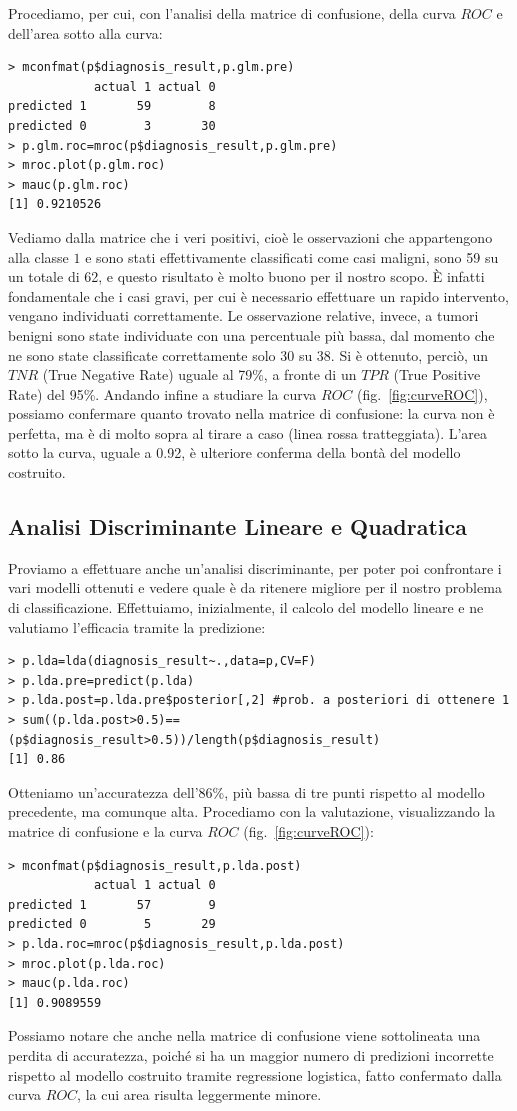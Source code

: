 \documentclass[11pt,a4paper,oneside]{article}
\begin{document}
Procediamo, per cui, con l'analisi della matrice di confusione, della curva $ROC$ e dell'area sotto alla curva:
\begin{verbatim}
> mconfmat(p$diagnosis_result,p.glm.pre)
            actual 1 actual 0
predicted 1       59        8
predicted 0        3       30
> p.glm.roc=mroc(p$diagnosis_result,p.glm.pre)
> mroc.plot(p.glm.roc)
> mauc(p.glm.roc)
[1] 0.9210526
\end{verbatim}
Vediamo dalla matrice che i veri positivi, cioè le osservazioni che appartengono alla classe $1$ e sono stati effettivamente classificati come casi maligni, sono 59 su un totale di 62, e questo risultato è molto buono per il nostro scopo. È infatti fondamentale che i casi gravi, per cui è necessario effettuare un rapido intervento, vengano individuati correttamente. Le osservazione relative, invece, a tumori benigni sono state individuate con una percentuale più bassa, dal momento che ne sono state classificate correttamente solo 30 su 38. Si è ottenuto, perciò, un $TNR$ (True Negative Rate) uguale al 79\%, a fronte di un $TPR$ (True Positive Rate) del 95\%.
Andando infine a studiare la curva $ROC$ (fig.~\vref{fig:curveROC}), possiamo confermare quanto trovato nella matrice di confusione: la curva non è perfetta, ma è di molto sopra al tirare a caso (linea rossa tratteggiata). L'area sotto la curva, uguale a 0.92, è ulteriore conferma della bontà del modello costruito.

\subsection{Analisi Discriminante Lineare e Quadratica}
Proviamo a effettuare anche un'analisi discriminante, per poter poi confrontare i vari modelli ottenuti e vedere quale è da ritenere migliore per il nostro problema di classificazione.
Effettuiamo, inizialmente, il calcolo del modello lineare e ne valutiamo l'efficacia tramite la predizione:
\begin{verbatim}
> p.lda=lda(diagnosis_result~.,data=p,CV=F)
> p.lda.pre=predict(p.lda)
> p.lda.post=p.lda.pre$posterior[,2] #prob. a posteriori di ottenere 1
> sum((p.lda.post>0.5)==(p$diagnosis_result>0.5))/length(p$diagnosis_result)
[1] 0.86
\end{verbatim}
Otteniamo un'accuratezza dell'86\%, più bassa di tre punti rispetto al modello precedente, ma comunque alta. Procediamo con la valutazione, visualizzando la matrice di confusione e la curva $ROC$ (fig.~\ref{fig:curveROC}):
\begin{verbatim}
> mconfmat(p$diagnosis_result,p.lda.post)
            actual 1 actual 0
predicted 1       57        9
predicted 0        5       29
> p.lda.roc=mroc(p$diagnosis_result,p.lda.post)
> mroc.plot(p.lda.roc)
> mauc(p.lda.roc)
[1] 0.9089559
\end{verbatim}
Possiamo notare che anche nella matrice di confusione viene sottolineata una perdita di accuratezza, poiché si ha un maggior numero di predizioni incorrette rispetto al modello costruito tramite regressione logistica, fatto confermato dalla curva $ROC$, la cui area risulta leggermente minore.
\end{document}
